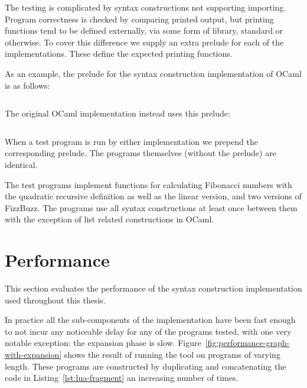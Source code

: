 \documentclass{kththesis}
\begin{document}
The testing is complicated by syntax constructions not supporting importing. Program correctness is checked by comparing printed output, but printing functions tend to be defined externally, via some form of library, standard or otherwise. To cover this difference we supply an extra prelude for each of the implementations. These define the expected printing functions.

As an example, the prelude for the syntax construction implementation of OCaml is as follows:

\inputminted{ocaml}{implementation/languages/ocaml/fake-prelude}

The original OCaml implementation instead uses this prelude:

\inputminted{ocaml}{implementation/languages/ocaml/real-prelude}

When a test program is run by either implementation we prepend the corresponding prelude. The programs themselves (without the prelude) are identical.

The test programs implement functions for calculating Fibonacci numbers with the quadratic recursive definition as well as the linear version, and two versions of FizzBuzz. The programs use all syntax constructions at least once between them with the exception of list related constructions in OCaml.

\section{Performance} \label{sec:performance}

This section evaluates the performance of the syntax construction implementation used throughout this thesis.

In practice all the sub-components of the implementation have been fast enough to not incur any noticeable delay for any of the programs tested, with one very notable exception: the expansion phase is slow. Figure~\ref{fig:performance-graph-with-expansion} shows the result of running the tool on programs of varying length. These programs are constructed by duplicating and concatenating the code in Listing~\ref{lst:lua-fragment} an increasing number of times.
\end{document}
